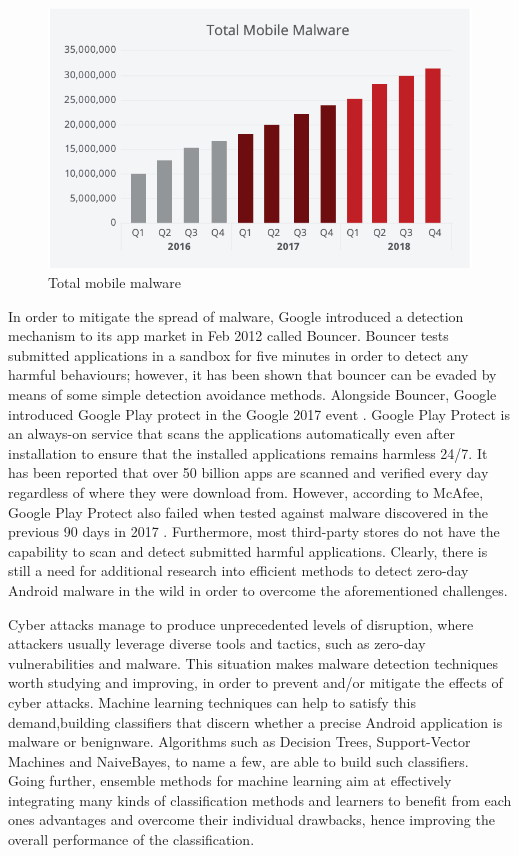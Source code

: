 \begin{figure}[htbp]
    \centering
    \includegraphics[scale=0.9]{./Figure/androidgraph.png}
    \caption{Total mobile malware \cite{mcafee}}
    \label{fig:androidgraph}
  \end{figure}

In order to mitigate the spread of malware, Google introduced a detection mechanism to its app market in Feb 2012 called Bouncer. Bouncer tests submitted applications in a sandbox for five minutes in order to detect any harmful behaviours; however, it has been shown that bouncer can be evaded by means of some simple detection avoidance methods. Alongside Bouncer, Google introduced Google Play protect in the Google 2017 event \cite{googleplay}. Google Play Protect is an always-on service that scans the applications automatically even after installation to ensure that the installed applications remains harmless 24/7. It has been reported that over 50 billion apps are scanned and verified every day regardless of where they were download from. However, according to McAfee, Google Play Protect also failed when tested against malware discovered in the previous 90 days in 2017 \cite{mcafee2018}. Furthermore, most third-party stores do not have the capability to scan and detect submitted harmful applications. Clearly, there is still a need for additional research into efficient methods to detect zero-day Android malware in the wild in order to overcome the aforementioned challenges.

Cyber attacks manage to produce unprecedented levels of disruption, where attackers usually leverage diverse tools and tactics, such as zero-day vulnerabilities and malware. This situation makes malware detection techniques worth studying and improving, in order to prevent and/or mitigate the effects of cyber attacks. Machine learning techniques can help to satisfy this demand,building classifiers that discern whether a precise Android application is malware or benignware. Algorithms such as Decision Trees, Support-Vector Machines and NaiveBayes, to name a few, are able to build such classifiers.　Going further, ensemble methods for machine learning aim at effectively integrating many kinds of classification methods and learners to benefit from each ones advantages and overcome their individual drawbacks, hence improving the overall performance of the classiﬁcation.

